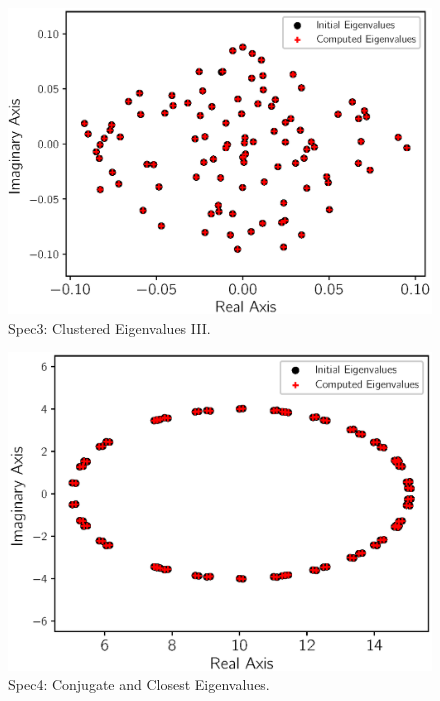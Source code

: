 \begin{figure}[htbp]
	\centering
	\includegraphics[width=5.8in]{fig/matgen/vector3.eps}
	\caption{Spec3: Clustered Eigenvalues III.}
	\label{fig_third_case}
\end{figure}


\begin{figure}[htbp]
	\centering
	\includegraphics[width=5.8in]{fig/matgen/vector5.eps}
	\caption{Spec4: Conjugate and Closest Eigenvalues.}
	\label{fig_forth_case}
\end{figure}

